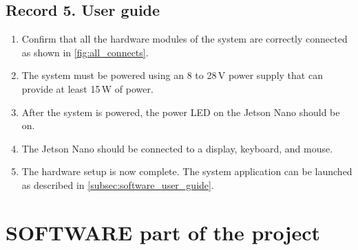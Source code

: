 \newpage
\subsection{Record 5. User guide}
\begin{enumerate}
  \item Confirm that all the hardware modules of the system are correctly connected as shown in \autoref{fig:all_connects}.
  \item The system must be powered using an 8 to 28\,V power supply that can provide at least 15\,W of power.
  \item After the system is powered, the power LED on the Jetson Nano should be on.
  \item The Jetson Nano should be connected to a display, keyboard, and mouse.
  \item The hardware setup is now complete. The system application can be launched as described in \autoref{subsec:software_user_guide}.
\end{enumerate}



\newpage
\section{SOFTWARE part of the project}
